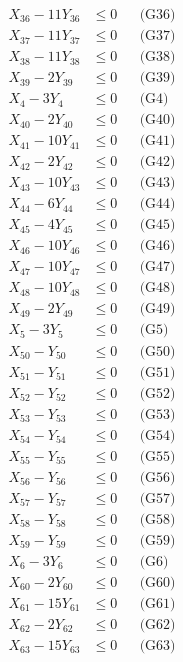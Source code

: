 \documentclass[a4paper,10pt]{article}
\begin{document}
{\begin{align}
X_{36} - 11Y_{36} &\leq 0 && \text{(G36)} \\
X_{37} - 11Y_{37} &\leq 0 && \text{(G37)} \\
X_{38} - 11Y_{38} &\leq 0 && \text{(G38)} \\
X_{39} - 2Y_{39} &\leq 0 && \text{(G39)} \\
X_{4} - 3Y_{4} &\leq 0 && \text{(G4)} \\
X_{40} - 2Y_{40} &\leq 0 && \text{(G40)} \\
X_{41} - 10Y_{41} &\leq 0 && \text{(G41)} \\
X_{42} - 2Y_{42} &\leq 0 && \text{(G42)} \\
X_{43} - 10Y_{43} &\leq 0 && \text{(G43)} \\
X_{44} - 6Y_{44} &\leq 0 && \text{(G44)} \\
\allowbreak
X_{45} - 4Y_{45} &\leq 0 && \text{(G45)} \\
X_{46} - 10Y_{46} &\leq 0 && \text{(G46)} \\
X_{47} - 10Y_{47} &\leq 0 && \text{(G47)} \\
X_{48} - 10Y_{48} &\leq 0 && \text{(G48)} \\
X_{49} - 2Y_{49} &\leq 0 && \text{(G49)} \\
X_{5} - 3Y_{5} &\leq 0 && \text{(G5)} \\
X_{50} - Y_{50} &\leq 0 && \text{(G50)} \\
X_{51} - Y_{51} &\leq 0 && \text{(G51)} \\
X_{52} - Y_{52} &\leq 0 && \text{(G52)} \\
X_{53} - Y_{53} &\leq 0 && \text{(G53)} \\
X_{54} - Y_{54} &\leq 0 && \text{(G54)} \\
X_{55} - Y_{55} &\leq 0 && \text{(G55)} \\
X_{56} - Y_{56} &\leq 0 && \text{(G56)} \\
X_{57} - Y_{57} &\leq 0 && \text{(G57)} \\
X_{58} - Y_{58} &\leq 0 && \text{(G58)} \\
X_{59} - Y_{59} &\leq 0 && \text{(G59)} \\
X_{6} - 3Y_{6} &\leq 0 && \text{(G6)} \\
X_{60} - 2Y_{60} &\leq 0 && \text{(G60)} \\
X_{61} - 15Y_{61} &\leq 0 && \text{(G61)} \\
X_{62} - 2Y_{62} &\leq 0 && \text{(G62)} \\
\allowbreak
X_{63} - 15Y_{63} &\leq 0 && \text{(G63)} \\

\end{align}}
\end{document}
